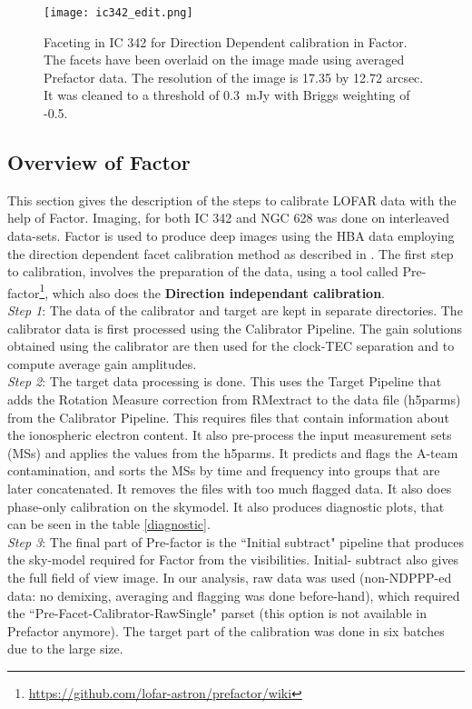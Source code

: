 \documentclass[../main/thesis_msc.tex]{subfiles}
\begin{document}
\begin{figure}[h]
\centering
\texttt{[image: ic342\_edit.png]}
\caption{Faceting in IC 342 for Direction Dependent calibration in Factor. The facets have been overlaid on the image made using averaged Prefactor data. The resolution of the image is 17.35 by 12.72 arcsec. It was cleaned to a threshold of 0.3~mJy with Briggs weighting of -0.5. }
\label{ic_facets}
\end{figure}


\subsection{Overview of Factor}
This section gives the description of the steps to calibrate LOFAR data with the help of Factor. Imaging, for both IC 342 and NGC 628 was done on interleaved data-sets. Factor is used to produce deep images using the HBA data employing the direction dependent facet calibration method as described in \citep{facet}. 
\noindent The first step to calibration, involves the preparation of the data, using a tool called Pre-factor\footnote{\url{https://github.com/lofar-astron/prefactor/wiki}}, which also does the \textbf{Direction independant calibration}. \\
\noindent \textit{Step 1}: The data of the calibrator and target are kept in separate directories. The calibrator data is first processed using the Calibrator Pipeline. The gain solutions obtained using the calibrator are then used for the clock-TEC separation and to compute average gain amplitudes.\\
\textit{Step 2}: The target data processing is done. This uses the Target Pipeline that adds the Rotation Measure correction from RMextract to the data file (h5parms) from the Calibrator Pipeline. This requires files that contain information about the ionospheric electron content. It also pre-process the input measurement sets (MSs) and applies the values from the h5parms. It predicts and flags the A-team contamination, and sorts the MSs by time and frequency into groups that are later concatenated. It removes the files with too much flagged data. It also does phase-only calibration on the skymodel. It also produces diagnostic plots, that can be seen in the table \ref{diagnostic}.\\
\textit{Step 3}: The final part of Pre-factor is the ``Initial subtract" pipeline that produces the sky-model required for Factor from the visibilities. Initial- subtract also gives the full field of view image. In our analysis, raw data was used (non-NDPPP-ed data: no demixing, averaging and flagging was done before-hand), which required the ``Pre-Facet-Calibrator-RawSingle" parset (this option is not available in Prefactor anymore). The target part of the calibration was done in six batches due to the large size.\\
\end{document}
